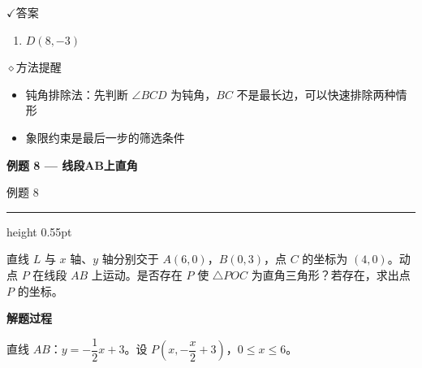 \documentclass{exam-zh}
\newcommand{\eduSectionTitle}[1]{%
  \needspace{5\baselineskip}%
  \vspace{2mm}
  {\color{edu-blue}\bfseries\large #1}\par
  \vspace{3mm}
}
\newenvironment{eduSubQuestionItem}[1]{%
  \needspace{4\baselineskip}%
  \vspace{2mm}
  \par\noindent
  \hangindent=8mm\hangafter=1
  {\color{edu-blue}\bfseries #1}\enspace
  \begingroup
  \color{edu-ink}
}{%
  \endgroup
  \par
  \vspace{3mm}
}
\newcommand{\eduIconCheck}{\(\checkmark\)}
\newcommand{\eduIconPin}{\(\diamond\)}
\newenvironment{eduProblemBlock}[1][题目]{%
  \needspace{8\baselineskip}
  {\small\color{edu-muted}#1}\par
  \vspace{1.5mm}
  {\color{edu-blue}\hrule height 0.55pt}
  \vspace{4.5mm}
  \begingroup
  \color{edu-ink}
  \large
  \setlength{\parskip}{2.2mm}
  \linespread{1.20}\selectfont
}{%
  \par
  \endgroup
  \vspace{6mm}
}
\newenvironment{eduBulletList}{%
  \begin{itemize}[
    label=\textbullet,
    leftmargin=5mm,
    itemsep=1.2mm,
    topsep=0pt,
    parsep=0pt
  ]
}{%
  \end{itemize}
}
\newenvironment{eduBottomGrid}{%
  \vspace{1mm}
  \par\noindent
}{%
  \par\vspace{1mm}
}
\newenvironment{eduSummaryLeft}{%
  \begin{minipage}[t]{0.30\linewidth}
}{%
  \end{minipage}
}
\newcommand{\eduSummaryDivider}{%
  \hspace{4mm}{\color{edu-line}\vrule width 0.35pt}\hspace{7mm}%
}
\newenvironment{eduSummaryRight}{%
  \begin{minipage}[t]{0.58\linewidth}
}{%
  \end{minipage}
}
\newenvironment{eduPlainList}{%
  \begin{enumerate}[
    label=(\arabic*),
    leftmargin=7mm,
    itemsep=1.2mm,
    topsep=0pt,
    parsep=0pt
  ]
}{%
  \end{enumerate}
}
\begin{document}
\begin{eduBottomGrid}
  \begin{eduSummaryLeft}
    \begin{eduSummaryBlock}{\eduIconCheck}{答案}
    \begin{eduPlainList}
      \item $D(8,-3)$    \end{eduPlainList}
    \end{eduSummaryBlock}
  \end{eduSummaryLeft}
  \eduSummaryDivider
  \begin{eduSummaryRight}
    \begin{eduSummaryBlock}{\eduIconPin}{方法提醒}
    \begin{eduBulletList}
      \item 钝角排除法：先判断 $\angle BCD$ 为钝角，$BC$ 不是最长边，可以快速排除两种情形      \item 象限约束是最后一步的筛选条件    \end{eduBulletList}
    \end{eduSummaryBlock}
  \end{eduSummaryRight}
\end{eduBottomGrid}



\eduSectionTitle{例题 8 — 线段AB上直角}

\begin{eduProblemBlock}[例题 8]
直线 $L$ 与 $x$ 轴、$y$ 轴分别交于 $A(6,0)$，$B(0,3)$，点 $C$ 的坐标为 $(4,0)$。动点 $P$ 在线段 $AB$ 上运动。是否存在 $P$ 使 $\triangle POC$ 为直角三角形？若存在，求出点 $P$ 的坐标。
\end{eduProblemBlock}





\begin{eduSubQuestionItem}{解题过程}
直线 $AB$：$y=-\dfrac{1}{2}x+3$。设 $P\left(x,-\dfrac{x}{2}+3\right)$，$0\leq x\leq 6$。\end{eduSubQuestionItem}
\end{document}
